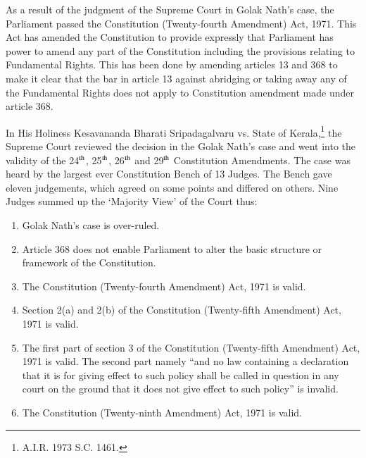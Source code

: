 \begin{multicols}{2}
\noi
As a result of the judgment of the Supreme Court in Golak Nath’s case, the Parliament passed
the Constitution (Twenty-fourth Amendment) Act, 1971. This Act has amended the
Constitution to provide expressly that Parliament has power to amend any part of the
Constitution including the provisions relating to Fundamental Rights. This has been done by
amending articles 13 and 368 to make it clear that the bar in article 13 against abridging or
taking away any of the Fundamental Rights does not apply to Constitution amendment made
under article 368.

\noi
In His Holiness Kesavananda Bharati Sripadagalvaru vs. State of Kerala,\footnote{A.I.R. 1973 S.C. 1461.} the Supreme Court
reviewed the decision in the Golak Nath’s case and went into the validity of the 24$^{\rm th}$, 25$^{\rm th}$, 26$^{\rm th}$
and 29$^{\rm th}$ Constitution Amendments. The case was heard by the largest ever Constitution Bench
of 13 Judges. The Bench gave eleven judgements, which agreed on some points and differed
on others. Nine Judges summed up the ‘Majority View’ of the Court thus:

\begin{enumerate}
\item Golak Nath’s case is over-ruled.

\item Article 368 does not enable Parliament to alter the basic structure or framework of the Constitution. 

\item The Constitution (Twenty-fourth Amendment) Act, 1971 is valid.

\item Section 2(a) and 2(b) of the Constitution (Twenty-fifth Amendment) Act, 1971 is valid.

\item The first part of section 3 of the Constitution (Twenty-fifth Amendment) Act, 1971 is
valid. The second part namely “and no law containing a declaration that it is for giving effect
to such policy shall be called in question in any court on the ground that it does not give effect
to such policy” is invalid.

\item The Constitution (Twenty-ninth Amendment) Act, 1971 is valid.
\end{enumerate}


\end{multicols}
